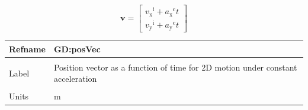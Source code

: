 \documentclass[12pt]{article}
\begin{document}
\begin{displaymath}
\mathbf{v}=\begin{bmatrix}
           {{v_{\text{x}}}^{\text{i}}}+{{a_{\text{x}}}^{\text{c}}} t\\
           {{v_{\text{y}}}^{\text{i}}}+{{a_{\text{y}}}^{\text{c}}} t
           \end{bmatrix}
\end{displaymath}
\vspace{\baselineskip}
\noindent
\begin{minipage}{\textwidth}
\begin{tabular}{>{\raggedright}p{}>{\raggedright\arraybackslash}p{}}
\toprule \textbf{Refname} & \textbf{GD:posVec}
\label{GD:posVec}
\\ \midrule \\
Label & Position vector as a function of time for 2D motion under constant acceleration
        
\\ \midrule \\
Units & ${\text{m}}$
        

\end{tabular}
\end{minipage}
\end{document}
